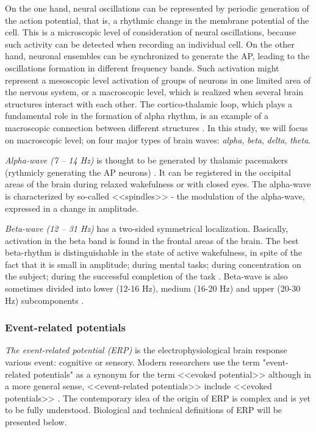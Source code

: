 \documentclass[14pt,a4paper]{scrartcl}
\begin{document}
On the one hand, neural oscillations can be represented by periodic generation of the action potential, that is, a rhythmic change in the membrane potential of the cell. This is a microscopic level of consideration of neural oscillations, because such activity can be detected when recording an individual cell. On the other hand, neuronal ensembles can be synchronized to generate the AP, leading to the oscillations formation in different frequency bands. Such activation might represent a mesoscopic level activation of groups of neurons in one limited area of the nervous system, or a macroscopic level, which is realized when several brain structures interact with each other. The cortico-thalamic loop, which plays a fundamental role in the formation of alpha rhythm, is an example of a macroscopic connection between different structures \cite{Domino2009,Bollimunta2011}. In this study, we will focus on macroscopic level; on four major types of brain waves: \textit{alpha}, \textit{beta}, \textit{delta}, \textit{theta}.

\textit{Alpha-wave (7 – 14 Hz)} is thought to be generated by thalamic pacemakers (rythmicly generating the AP neurons) \cite{Domino2009}. It can be registered in the occipital areas of the brain during relaxed wakefulness or with closed eyes. The alpha-wave is characterized by so-called <<spindles>> - the modulation of the alpha-wave, expressed in a change in amplitude\cite{Buzsaki2009}.

\textit{Beta-wave (12 – 31 Hz)} has a two-sided symmetrical localization. Basically, activation in the beta band is found in the frontal areas of the brain. The best beta-rhythm is distinguishable in the state of active wakefulness, in spite of the fact that it is small in amplitude; during mental tasks; during concentration on the subject; during the successful completion of the task \cite{Buzsaki2009,Engel2010}. 
Beta-wave is also sometimes divided into lower (12-16 Hz), medium (16-20 Hz) and upper (20-30 Hz) subcomponents \cite{Rangaswamy2003}.

\textit{}



\subsubsection{Event-related potentials}
\label{sec:Hypothesis:Bioelectricity:Event-related potentials}

 \textit{The event-related potential (ERP)} is the electrophysiological brain response various event: cognitive or sensory. Modern researchers use the term "event-related potentials" as a synonym for the term <<evoked potential>> although in a more general sense, <<event-related potentials>> include <<evoked potentials>> \cite{Luck2005}. The contemporary idea of the origin of ERP is complex and is yet to be fully understood. Biological and technical definitions of ERP will be presented below. 
\end{document}
